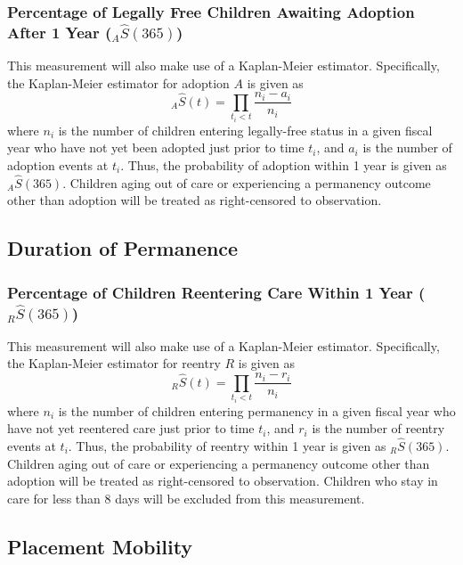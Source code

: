 \documentclass[12pt]{article}\usepackage[]{graphicx}\usepackage[]{color}
\begin{document}
\subsubsection{Percentage of Legally Free Children Awaiting Adoption After 1 Year (${}_{A}\hat{S}(365)$)}

This measurement will also make use of a Kaplan-Meier estimator. Specifically, the Kaplan-Meier estimator for adoption $A$ is given as
\begin{equation}\label{eq:KM}
{}_A\hat S(t) = \prod\limits_{t_i<t} \frac{n_i-a_{i}}{n_i}
\end{equation}
where $n_{i}$ is the number of children entering legally-free status in a given fiscal year who have not yet been adopted just prior to time $t_{i}$, and $a_{i}$ is the number of adoption events at $t_{i}$. Thus, the probability of adoption within 1 year is given as ${}_A\hat S(365)$. Children aging out of care or experiencing a permanency outcome other than adoption will be treated as right-censored to observation. 

\subsection{Duration of Permanence}

\subsubsection{Percentage of Children Reentering Care Within 1 Year (${}_{R}\hat{S}(365)$)}

This measurement will also make use of a Kaplan-Meier estimator. Specifically, the Kaplan-Meier estimator for reentry $R$ is given as
\begin{equation}\label{eq:KM}
{}_R\hat S(t) = \prod\limits_{t_i<t} \frac{n_i-r_{i}}{n_i}
\end{equation}
where $n_{i}$ is the number of children entering permanency in a given fiscal year who have not yet reentered care just prior to time $t_{i}$, and $r_{i}$ is the number of reentry events at $t_{i}$. Thus, the probability of reentry within 1 year is given as ${}_R\hat S(365)$. Children aging out of care or experiencing a permanency outcome other than adoption will be treated as right-censored to observation. Children who stay in care for less than 8 days will be excluded from this measurement.

\subsection{Placement Mobility}
\end{document}
